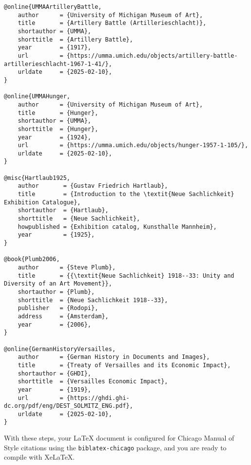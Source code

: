 \documentclass{article}
\begin{document}
\begin{lstlisting}
@online{UMMAArtilleryBattle,
    author      = {University of Michigan Museum of Art},
    title       = {Artillery Battle (Artillerieschlacht)},
    shortauthor = {UMMA},
    shorttitle  = {Artillery Battle},
    year        = {1917},
    url         = {https://umma.umich.edu/objects/artillery-battle-artillerieschlacht-1967-1-41/},
    urldate     = {2025-02-10},
}

@online{UMMAHunger,
    author      = {University of Michigan Museum of Art},
    title       = {Hunger},
    shortauthor = {UMMA},
    shorttitle  = {Hunger},
    year        = {1924},
    url         = {https://umma.umich.edu/objects/hunger-1957-1-105/},
    urldate     = {2025-02-10},
}

@misc{Hartlaub1925,
    author       = {Gustav Friedrich Hartlaub},
    title        = {Introduction to the \textit{Neue Sachlichkeit} Exhibition Catalogue},
    shortauthor  = {Hartlaub},
    shorttitle   = {Neue Sachlichkeit},
    howpublished = {Exhibition catalog, Kunsthalle Mannheim},
    year         = {1925},
}

@book{Plumb2006,
    author      = {Steve Plumb},
    title       = {{\textit{Neue Sachlichkeit} 1918--33: Unity and Diversity of an Art Movement}},
    shortauthor = {Plumb},
    shorttitle  = {Neue Sachlichkeit 1918--33},
    publisher   = {Rodopi},
    address     = {Amsterdam},
    year        = {2006},
}

@online{GermanHistoryVersailles,
    author      = {German History in Documents and Images},
    title       = {Treaty of Versailles and its Economic Impact},
    shortauthor = {GHDI},
    shorttitle  = {Versailles Economic Impact},
    year        = {1919},
    url         = {https://ghdi.ghi-dc.org/pdf/eng/DEST_SOLMITZ_ENG.pdf},
    urldate     = {2025-02-10},
}
\end{lstlisting}

\bigskip

With these steps, your LaTeX document is configured for Chicago Manual of Style citations using the \texttt{biblatex-chicago} package, and you are ready to compile with XeLaTeX.
\end{document}
